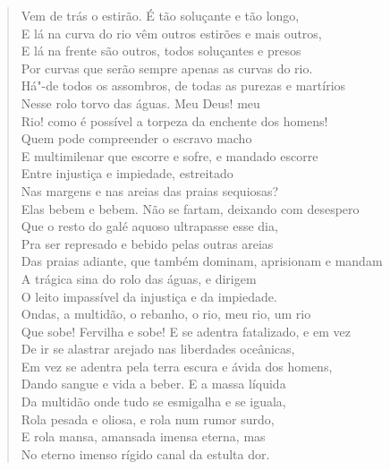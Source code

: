 {\begin{verse}
Vem de trás o estirão. É tão soluçante e tão longo,\\
E lá na curva do rio vêm outros estirões e mais outros,\\
E lá na frente são outros, todos soluçantes e presos\\
Por curvas que serão sempre apenas as curvas do rio.\\
Há"-de todos os assombros, de todas as purezas e martírios\\
Nesse rolo torvo das águas. Meu Deus! meu\\
Rio! como é possível a torpeza da enchente dos homens!\\
Quem pode compreender o escravo macho\\
E multimilenar que escorre e sofre, e mandado escorre\\
Entre injustiça e impiedade, estreitado\\
Nas margens e nas areias das praias sequiosas?\\
Elas bebem e bebem. Não se fartam, deixando com desespero\\
Que o resto do galé aquoso ultrapasse esse dia,\\
Pra ser represado e bebido pelas outras areias\\
Das praias adiante, que também dominam, aprisionam e mandam\\
A trágica sina do rolo das águas, e dirigem\\
O leito impassível da injustiça e da impiedade.\\
Ondas, a multidão, o rebanho, o rio, meu rio, um rio\\
Que sobe! Fervilha e sobe! E se adentra fatalizado, e em vez\\
De ir se alastrar arejado nas liberdades oceânicas,\\
Em vez se adentra pela terra escura e ávida dos homens,\\
Dando sangue e vida a beber. E a massa líquida\\
Da multidão onde tudo se esmigalha e se iguala,\\
Rola pesada e oliosa, e rola num rumor surdo,\\
E rola mansa, amansada imensa eterna, mas\\
No eterno imenso rígido canal da estulta dor.


\end{verse}}
